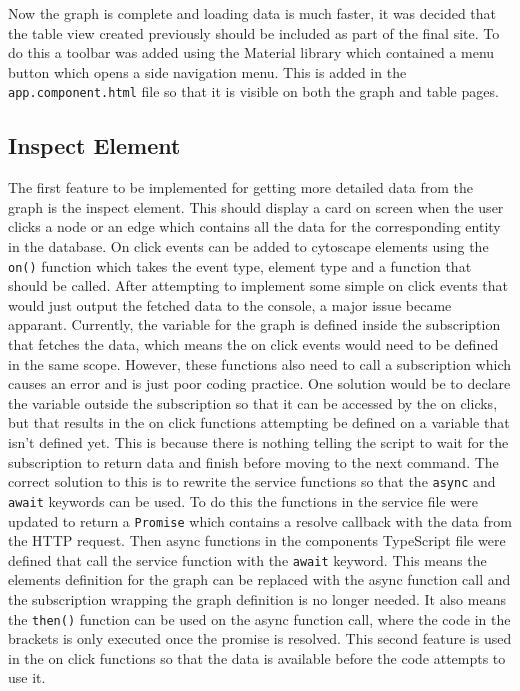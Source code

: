 Now the graph is complete and loading data is much faster, it was decided that the table view created previously should be included as part of the final site. 
To do this a toolbar was added using the Material library which contained a menu button which opens a side navigation menu. This is added in the \verb|app.component.html| file so that it 
is visible on both the graph and table pages.
\subsection{Inspect Element}
The first feature to be implemented for getting more detailed data from the graph is the inspect element. This should display 
a card on screen when the user clicks a node or an edge which contains all the data for the corresponding entity in the database. 
On click events can be added to cytoscape elements using the \verb|on()| function which takes the event type, element type and a function that should be called. 
After attempting to implement some simple on click events that would just output the fetched data to the console, a major issue became apparant.
Currently, the variable for the graph is defined inside the subscription that fetches the data, which means the on click events would need to be 
defined in the same scope. However, these functions also need to call a subscription which causes an error and is just poor coding practice. One solution 
would be to declare the variable outside the subscription so that it can be accessed by the on clicks, but that results in the on click 
functions attempting be defined on a variable that isn't defined yet. This is because there is nothing telling the script to wait for the 
subscription to return data and finish before moving to the next command. The correct solution to this is to rewrite the service functions so that 
the \verb|async| and \verb|await| keywords can be used. To do this the functions in the service file were updated to return a \verb|Promise| which contains a resolve 
callback with the data from the HTTP request. Then async functions in the components TypeScript file were defined that call the service function 
with the \verb|await| keyword. This means the elements definition for the graph can be replaced with the async function call 
and the subscription wrapping the graph definition is no longer needed. It also means the \verb|then()| function can be used on the async function call, 
where the code in the brackets is only executed once the promise is resolved. This second feature is used in the on click functions so that the data is available 
before the code attempts to use it.

